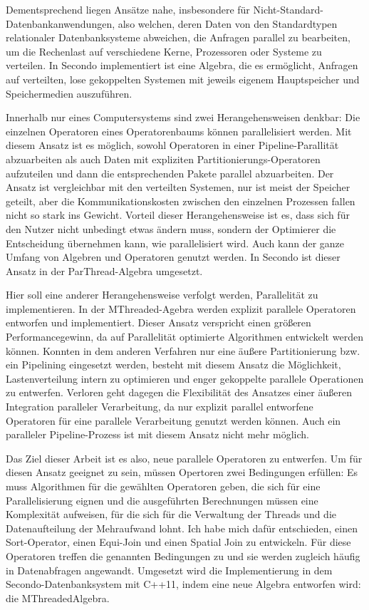 \documentclass[a4paper,12pt,twoside]{article}
\begin{document}
Dementsprechend liegen Ansätze nahe, insbesondere für Nicht-Standard-Datenbankanwendungen, also welchen, deren Daten von den Standardtypen relationaler Datenbanksysteme abweichen, die Anfragen parallel zu bearbeiten, um die Rechenlast auf verschiedene Kerne, Prozessoren oder Systeme zu verteilen. In Secondo implementiert ist eine Algebra, die es ermöglicht, Anfragen auf verteilten, lose gekoppelten Systemen mit jeweils eigenem Hauptspeicher und Speichermedien auszuführen.

Innerhalb nur eines Computersystems sind zwei Herangehensweisen denkbar: Die einzelnen Operatoren eines Operatorenbaums können parallelisiert werden. Mit diesem Ansatz ist es möglich, sowohl Operatoren in einer Pipeline-Parallität abzuarbeiten als auch Daten mit expliziten Partitionierungs-Operatoren aufzuteilen und dann die entsprechenden Pakete parallel abzuarbeiten. Der Ansatz ist vergleichbar mit den verteilten Systemen, nur ist meist der Speicher geteilt, aber die Kommunikationskosten zwischen den einzelnen Prozessen fallen nicht so stark ins Gewicht. Vorteil dieser Herangehensweise ist es, dass sich für den Nutzer nicht unbedingt etwas ändern muss, sondern der Optimierer die Entscheidung übernehmen kann, wie parallelisiert wird. Auch kann der ganze Umfang von Algebren und Operatoren genutzt werden. In Secondo ist dieser Ansatz in der ParThread-Algebra umgesetzt.

Hier soll eine anderer Herangehensweise verfolgt werden, Parallelität zu implementieren. In der MThreaded-Agebra werden explizit parallele Operatoren entworfen und implementiert. Dieser Ansatz verspricht einen größeren Performancegewinn, da auf Parallelität optimierte Algorithmen entwickelt werden können. Konnten in dem anderen Verfahren nur eine äußere Partitionierung bzw. ein Pipelining eingesetzt werden, besteht mit diesem Ansatz die Möglichkeit, Lastenverteilung intern zu optimieren und enger gekoppelte parallele Operationen zu entwerfen. Verloren geht dagegen die Flexibilität des Ansatzes einer äußeren Integration paralleler Verarbeitung, da nur explizit parallel entworfene Operatoren für eine parallele Verarbeitung genutzt werden können. Auch ein paralleler Pipeline-Prozess ist mit diesem Ansatz nicht mehr möglich.

Das Ziel dieser Arbeit ist es also, neue parallele Operatoren zu entwerfen. Um für diesen Ansatz geeignet zu sein, müssen Opertoren zwei Bedingungen erfüllen: Es muss Algorithmen für die gewählten Operatoren geben, die sich für eine Parallelisierung eignen und die ausgeführten Berechnungen müssen eine Komplexität aufweisen, für die sich für die Verwaltung der Threads und die Datenaufteilung der Mehraufwand lohnt. Ich habe mich dafür entschieden, einen Sort-Operator, einen Equi-Join und einen Spatial Join zu entwickeln. Für diese Operatoren treffen die genannten Bedingungen zu und sie werden zugleich häufig in Datenabfragen angewandt. Umgesetzt wird die Implementierung in dem Secondo-Datenbanksystem mit C++11, indem eine neue Algebra entworfen wird: die MThreadedAlgebra. 
\end{document}

